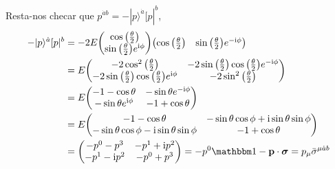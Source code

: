 Resta-nos checar que $p^{\dot a b}=-|p\rangle^{\dot a}[p|^b$,
\begin{align*}
    -|p\rangle^{\dot a}[p|^b&=-2E\mqty(\cos\qty(\frac\theta2)\\\sin\qty(\frac\theta2)e^{\im\phi})\mqty(\cos\qty(\frac\theta2)&\sin\qty(\frac\theta2)e^{-\im\phi})\\
    &=E\mqty(-2\cos^2\qty(\frac\theta2)&-2\sin\qty(\frac\theta2)\cos\qty(\frac\theta2)e^{-\im\phi}\\-2\sin\qty(\frac\theta2)\cos\qty(\frac\theta2)e^{\im \phi}&-2\sin^2\qty(\frac\theta2))\\
    &=E\mqty(-1-\cos\theta&-\sin\theta e^{-\im\phi}\\-\sin\theta e^{\im \phi}&-1+\cos\theta)\\
    &=E\mqty(-1-\cos\theta&-\sin\theta\cos\phi+\im\sin\theta\sin\phi\\-\sin\theta\cos\phi-\im\sin\theta\sin\phi&-1+\cos\theta)\\
    &=\mqty(-p^0-p^3&-p^1+\im p^2\\-p^1-\im p^2&-p^0+p^3)=-p^0\mathbbm 1-\vb p\cdot\boldsymbol\sigma=p_\mu{\bar\sigma}^{\mu\dot a b}
\end{align*}


